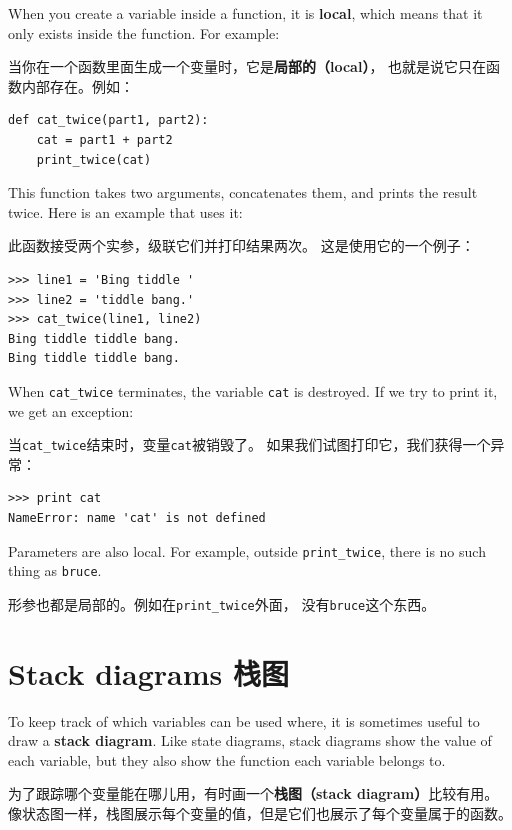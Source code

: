 \documentclass[10pt]{book}
\begin{document}
\begin{CJK}{UTF8}{gbsn}
When you create a variable inside a function, it is {\bf local},
which means that it only
exists inside the function.  For example:

当你在一个函数里面生成一个变量时，它是{\bf 局部的（local）}，
也就是说它只在函数内部存在。例如：

\begin{verbatim}
def cat_twice(part1, part2):
    cat = part1 + part2
    print_twice(cat)
\end{verbatim}
%
This function takes two arguments, concatenates them, and prints
the result twice.  Here is an example that uses it:

此函数接受两个实参，级联它们并打印结果两次。
这是使用它的一个例子：

\begin{verbatim}
>>> line1 = 'Bing tiddle '
>>> line2 = 'tiddle bang.'
>>> cat_twice(line1, line2)
Bing tiddle tiddle bang.
Bing tiddle tiddle bang.
\end{verbatim}
%
When \verb"cat_twice" terminates, the variable {\tt cat}
is destroyed.  If we try to print it, we get an exception:

当\verb"cat_twice"结束时，变量{\tt cat}被销毁了。
如果我们试图打印它，我们获得一个异常：

\begin{verbatim}
>>> print cat
NameError: name 'cat' is not defined
\end{verbatim}
%
Parameters are also local.
For example, outside \verb"print_twice", there is no
such thing as {\tt bruce}.

形参也都是局部的。例如在\verb"print_twice"外面，
没有{\tt bruce}这个东西。


\section{Stack diagrams 栈图}
\label{stackdiagram}

To keep track of which variables can be used where, it is sometimes
useful to draw a {\bf stack diagram}.  Like state diagrams, stack
diagrams show the value of each variable, but they also show the
function each variable belongs to.

为了跟踪哪个变量能在哪儿用，有时画一个{\bf 栈图（stack diagram）}比较有用。
像状态图一样，栈图展示每个变量的值，但是它们也展示了每个变量属于的函数。


\end{CJK}
\end{document}
